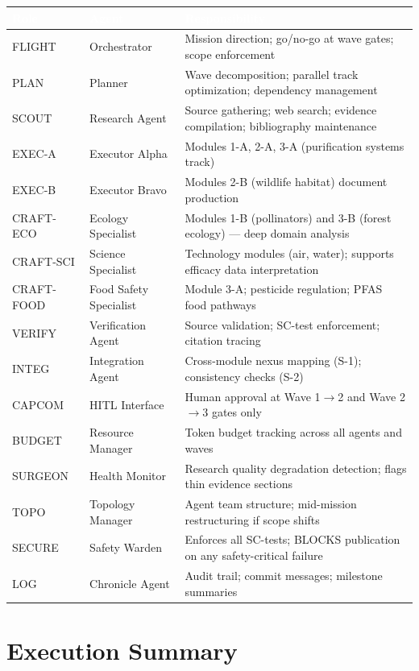\documentclass[11pt,letterpaper]{article}
\newcommand{\tableheader}[1]{\textbf{\sffamily\textcolor{white}{#1}}}
\begin{document}
\begin{center}
\begin{tabularx}{\textwidth}{L{2cm}L{3cm}X}
\toprule
{}
\tableheader{Role} & \tableheader{Agent} & \tableheader{Responsibility} \\
\midrule
FLIGHT & Orchestrator & Mission direction; go/no-go at wave gates; scope enforcement \\
PLAN & Planner & Wave decomposition; parallel track optimization; dependency management \\
SCOUT & Research Agent & Source gathering; web search; evidence compilation; bibliography maintenance \\
EXEC-A & Executor Alpha & Modules 1-A, 2-A, 3-A (purification systems track) \\
EXEC-B & Executor Bravo & Modules 2-B (wildlife habitat) document production \\
CRAFT-ECO & Ecology Specialist & Modules 1-B (pollinators) and 3-B (forest ecology) --- deep domain analysis \\
CRAFT-SCI & Science Specialist & Technology modules (air, water); supports efficacy data interpretation \\
CRAFT-FOOD & Food Safety Specialist & Module 3-A; pesticide regulation; PFAS food pathways \\
VERIFY & Verification Agent & Source validation; SC-test enforcement; citation tracing \\
INTEG & Integration Agent & Cross-module nexus mapping (S-1); consistency checks (S-2) \\
CAPCOM & HITL Interface & Human approval at Wave 1$\to$2 and Wave 2$\to$3 gates only \\
BUDGET & Resource Manager & Token budget tracking across all agents and waves \\
SURGEON & Health Monitor & Research quality degradation detection; flags thin evidence sections \\
TOPO & Topology Manager & Agent team structure; mid-mission restructuring if scope shifts \\
SECURE & Safety Warden & Enforces all SC-tests; BLOCKS publication on any safety-critical failure \\
LOG & Chronicle Agent & Audit trail; commit messages; milestone summaries \\
\bottomrule
\end{tabularx}
\end{center}

\section{Execution Summary}
\end{document}
